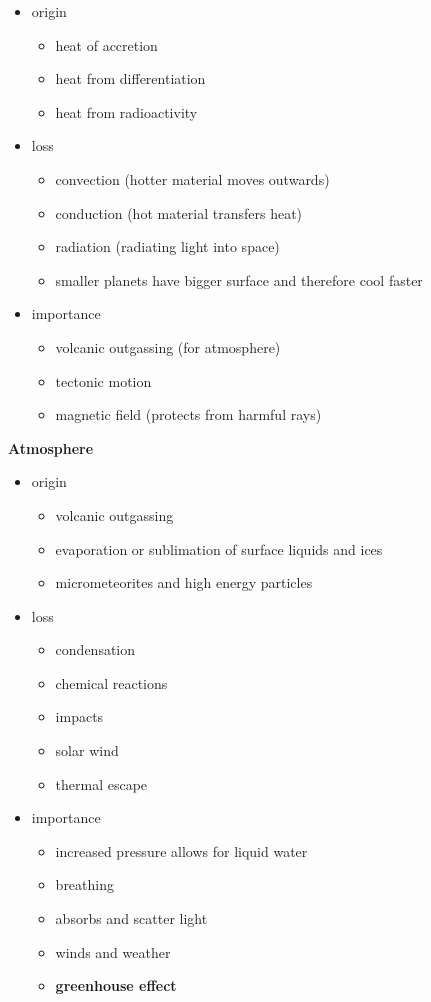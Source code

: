 \documentclass{article}
\theoremstyle{sltheorem}
\begin{document}
\begin{itemize}
    \item origin
    \begin{itemize}
        \item heat of accretion
        \item heat from differentiation
        \item heat from radioactivity
    \end{itemize}
    \item loss
    \begin{itemize}
        \item convection (hotter material moves outwards)
        \item conduction (hot material transfers heat)
        \item radiation (radiating light into space)
        \item smaller planets have bigger surface and therefore cool faster
    \end{itemize}
    \item importance
    \begin{itemize}
        \item volcanic outgassing (for atmosphere)
        \item tectonic motion
        \item magnetic field (protects from harmful rays)
    \end{itemize}
\end{itemize}
\textbf{Atmosphere}
\begin{itemize}
    \item origin
    \begin{itemize}
        \item volcanic outgassing
        \item evaporation or sublimation of surface liquids and ices
        \item micrometeorites and high energy particles
    \end{itemize}
    \item loss
    \begin{itemize}
        \item condensation
        \item chemical reactions
        \item impacts
        \item solar wind
        \item thermal escape
    \end{itemize}
    \item importance
    \begin{itemize}
        \item increased pressure allows for liquid water
        \item breathing
        \item absorbs and scatter light
        \item winds and weather
        \item \textbf{greenhouse effect}
    \end{itemize}
\end{itemize}
\end{document}
